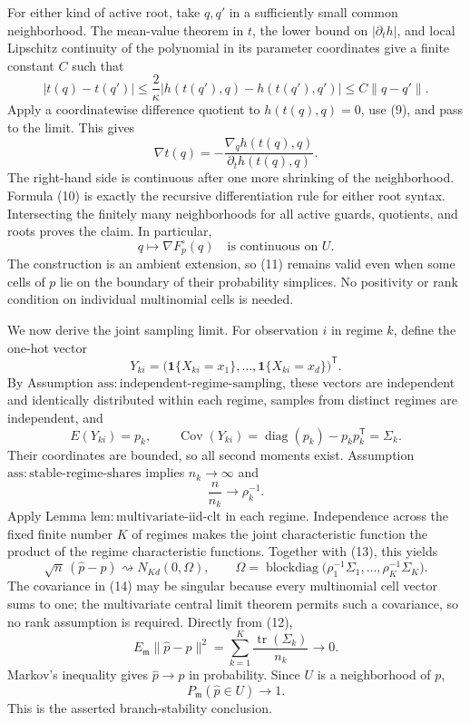 For either kind of active root, take \(q,q'\) in a sufficiently small common neighborhood.  The mean-value theorem in \(t\), the lower bound on \(|\partial_t h|\), and local Lipschitz continuity of the polynomial in its parameter coordinates give a finite constant \(C\) such that
\[
 |t(q)-t(q')|
 \leq \frac{2}{\kappa}
       |h(t(q'),q)-h(t(q'),q')|
 \leq C\|q-q'\|. \tag{9}
\]
Apply a coordinatewise difference quotient to \(h(t(q),q)=0\), use (9), and pass to the limit.  This gives
\[
 \nabla t(q)
 =-\frac{\nabla_q h(t(q),q)}{\partial_t h(t(q),q)}. \tag{10}
\]
The right-hand side is continuous after one more shrinking of the neighborhood.  Formula (10) is exactly the recursive differentiation rule for either root syntax.  Intersecting the finitely many neighborhoods for all active guards, quotients, and roots proves the claim.  In particular,
\[
 q\longmapsto\nabla F_p^{\circ}(q)
 \quad\text{is continuous on }U. \tag{11}
\]
The construction is an ambient extension, so (11) remains valid even when some cells of \(p\) lie on the boundary of their probability simplices.  No positivity or rank condition on individual multinomial cells is needed.

We now derive the joint sampling limit.  For observation \(i\) in regime \(k\), define the one-hot vector
\[
 Y_{ki}=\bigl(\mathbf 1\{X_{ki}=x_1\},\ldots,
                    \mathbf 1\{X_{ki}=x_d\}\bigr)^{\mathsf T}.
\]
By Assumption \(\mathrm{ass:independent\text{-}regime\text{-}sampling}\), these vectors are independent and identically distributed within each regime, samples from distinct regimes are independent, and
\[
 E(Y_{ki})=p_k,
 \qquad
 \operatorname{Cov}(Y_{ki})
 =\operatorname{diag}(p_k)-p_kp_k^{\mathsf T}
 =\Sigma_k. \tag{12}
\]
Their coordinates are bounded, so all second moments exist.  Assumption \(\mathrm{ass:stable\text{-}regime\text{-}shares}\) implies \(n_k\to\infty\) and
\[
 \frac{n}{n_k}\longrightarrow\rho_k^{-1}. \tag{13}
\]
Apply Lemma \(\mathrm{lem:multivariate\text{-}iid\text{-}clt}\) in each regime.  Independence across the fixed finite number \(K\) of regimes makes the joint characteristic function the product of the regime characteristic functions.  Together with (13), this yields
\[
 \sqrt n\,(\widehat p-p)
 \rightsquigarrow
 N_{Kd}(0,\Omega),
 \qquad
 \Omega=\operatorname{blockdiag}
 \bigl(\rho_1^{-1}\Sigma_1,\ldots,
       \rho_K^{-1}\Sigma_K\bigr). \tag{14}
\]
The covariance in (14) may be singular because every multinomial cell vector sums to one; the multivariate central limit theorem permits such a covariance, so no rank assumption is required.  Directly from (12),
\[
 E_{\mathfrak m}\|\widehat p-p\|^2
 =\sum_{k=1}^{K}\frac{\operatorname{tr}(\Sigma_k)}{n_k}
 \longrightarrow0. \tag{15}
\]
Markov's inequality gives \(\widehat p\to p\) in probability.  Since \(U\) is a neighborhood of \(p\),
\[
 P_{\mathfrak m}(\widehat p\in U)\longrightarrow1. \tag{16}
\]
This is the asserted branch-stability conclusion.

